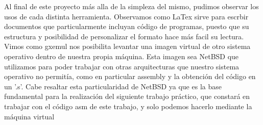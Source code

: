 \documentclass[10pt,a4paper]{article}
\begin{document}
Al final de este proyecto más alla de la simpleza del mismo, pudimos observar los usos de cada distinta herramienta. Observamos como LaTex sirve para escrbir documentos que particularmente incluyan código de programas, puesto que su estructura y posibilidad de personalizar el formato hace más facil su lectura. Vimos como gxemul nos posibilita levantar una imagen virtual de otro sistema operativo dentro de nuestra propia máquina. Esta imagen sea NetBSD que utilizamos para poder trabajar con otras arquitecturas que nuestro sistema operativo no permitía, como en particular assembly y la obtención del código en un '.s'. Cabe resaltar esta particularidad de NetBSD  ya que es la base fundamental para la realización del siguiente trabajo práctico, que constará en trabajar con el código asm de este trabajo, y solo podemos hacerlo mediante la máquina virtual
\end{document}
